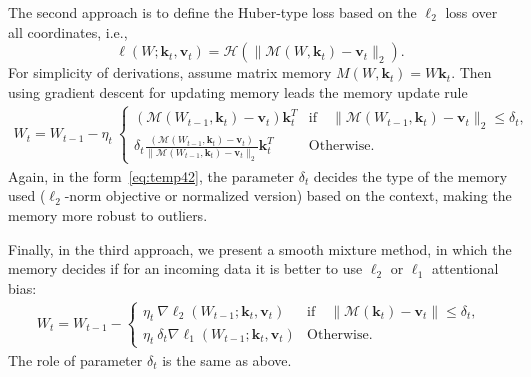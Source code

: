 \documentclass{article}
\newcommand{\vk}[0]{\mathbf{k}}
\newcommand{\vvv}[0]{\mathbf{v}}
\newcommand{\M}[0]{\mathcal{M}}
\theoremstyle{plain}
\theoremstyle{definition}
\theoremstyle{remark}
\begin{document}
The second approach is to define the Huber-type loss based on the $\ell_2$ loss over all coordinates, i.e., 
\[
\ell(W;\vk_t,\vvv_t)  = \mathcal{H} (\|\M(W,\vk_t) - \vvv_t\|_2).
\]
For simplicity of derivations, assume matrix memory $M(W,\vk_t) = W\vk_t$. Then using gradient descent for updating memory leads the memory update rule
\begin{align}
\label{eq:temp42}
    W_t = W_{t-1} - \eta_t \: 
    \begin{cases} 
     \left(\M(W_{t-1},\vk_t)-\vvv_t\right)\vk_t^T   &  \text{if} \quad \| \M(W_{t-1},\vk_t) - \vvv_t \|_2 \leq \delta_t, \\
   \delta_t \frac{\left(\M(W_{t-1},\vk_t)-\vvv_t\right)}{\|\M(W_{t-1},\vk_t)-\vvv_t\|_2}\vk_t^T   & \text{Otherwise}.
    \end{cases} 
\end{align}
Again, in the form~\eqref{eq:temp42}, the parameter $\delta_t$ decides the type of the memory used  ($\ell_2$-norm objective or normalized version) based on the context, making the memory more robust to outliers. 

Finally, in the third approach, we present a smooth mixture method, in which the memory decides if for an incoming data it is better to use $\ell_2$ or $\ell_1$ attentional bias: 
\begin{align}\label{eq:huber-loss}
    W_t = W_{t-1} - \begin{cases} 
    \eta_t \: \nabla \ell_2 (W_{t-1}; \vk_t, \vvv_t)   &  \text{if} \quad \| \M(\vk_t) - \vvv_t \| \leq \delta_t, \\
    \eta_t \: \delta_t \nabla  \ell_1 (W_{t-1}; \vk_t, \vvv_t)  & \text{Otherwise}.
    \end{cases} 
\end{align}
The role of parameter $\delta_t$ is the same as above. 
\end{document}
